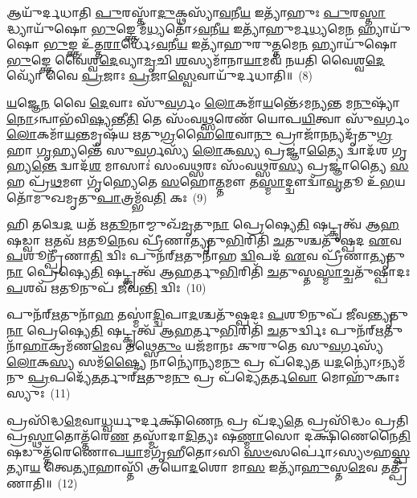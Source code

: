 𑌆𑌯𑍁᳴𑌰𑍍𑌦𑌧𑌾𑌤𑌿 \ul{𑌪𑍁}\-𑌰𑌸𑍍𑌤𑌾᳴\-\ul{𑌦𑍁}\-𑌕𑍍𑌥𑌸𑍍𑌯𑌾᳴\-\ul{𑌵}\-𑌨𑍀\-\ul{𑌯} 𑌇𑌤𑍍𑌯𑌾᳴𑌹𑍁𑌃 \ul{𑌪𑍁}\-𑌰\-\ul{𑌸𑍍𑌤𑌾}\-𑌦𑍍𑌧𑍍𑌯𑌾𑌯𑍁᳴𑌷𑍋 \ul{𑌭𑍁}\-𑌙𑍍𑌕𑍍𑌤𑍇 𑌮᳴\-\ul{𑌧𑍍𑌯}\-𑌤𑍋᳴\-𑌽\-\ul{𑌵}\-𑌨𑍀\-\ul{𑌯} 𑌇𑌤𑍍𑌯𑌾᳴𑌹𑍁𑌰𑍍𑌮\-\ul{𑌧𑍍𑌯}\-𑌮𑍇\-\ul{𑌨} 𑌹𑍍𑌯𑌾𑌯𑍁᳴𑌷𑍋 \ul{𑌭𑍁}\-𑌙𑍍𑌕𑍍𑌤 𑌉᳴𑌤𑍍𑌤\-\ul{𑌰𑌾}\-𑌰𑍍𑌧𑍇᳴\-𑌽\-\ul{𑌵}\-𑌨𑍀\-\ul{𑌯} 𑌇𑌤𑍍𑌯𑌾᳴𑌹𑍁𑌰𑍁\-\ul{𑌤𑍍𑌤}\-𑌮𑍇\-\ul{𑌨} 𑌹𑍍𑌯𑌾𑌯𑍁᳴𑌷𑍋 \ul{𑌭𑍁}\-𑌙𑍍𑌕𑍍𑌤𑍇 𑌵𑍈॑𑌶𑍍𑌵\-\ul{𑌦𑍇}\-𑌵𑍍𑌯𑌾\-\ul{𑌮𑍃}\-𑌚𑌿 \ul{𑌶}\-𑌸𑍍𑌯𑌮𑌾᳴𑌨𑌾\-\ul{𑌯𑌾}\-𑌮𑌵᳴ 𑌨𑌯𑌤𑌿 𑌵𑍈𑌶𑍍𑌵\-\ul{𑌦𑍇}\-𑌵𑍍𑌯𑍋᳴ 𑌵𑍈 \ul{𑌪𑍍𑌰}\-𑌜𑌾𑌃 \ul{𑌪𑍍𑌰}\-𑌜𑌾\-\ul{𑌸𑍍𑌵𑍇}\-𑌵𑌾𑌯𑍁᳴𑌰𑍍𑌦𑌧𑌾𑌤𑌿॥~(8)

{\anuvakamend[{\-\ul{𑌧𑍍𑌰𑍁}\-𑌵𑌸𑍍𑌤𑌸𑍍𑌮𑌾᳴\-\ul{𑌦𑍇}\-𑌵 \ul{𑌯}\-𑌜𑍍𑌞𑌸𑍍𑌯𑍈\-\ul{𑌕𑌾}\-𑌨𑍍𑌨𑌚᳴𑌤𑍍𑌵𑌾\-\ul{𑌰𑌿}\-\-\ul{𑍞}\-𑌶𑌚𑍍𑌚᳴}]}%

\-\ul{𑌯}\-𑌜𑍍𑌞𑍇\-\ul{𑌨} 𑌵𑍈 \ul{𑌦𑍇}\-𑌵𑌾𑌃 𑌸𑍁᳴\-\ul{𑌵}\-𑌰𑍍𑌗𑌂 \ul{𑌲𑍋}\-𑌕𑌮𑌾᳴\-\ul{𑌯}\-𑌨𑍍𑌤𑍇᳴\-𑌽𑌮𑌨𑍍𑌯𑌨𑍍𑌤 𑌮\-\ul{𑌨𑍁}\-𑌷𑍍𑌯𑌾᳴ \ul{𑌨𑍋}\-\-𑌽𑌨𑍍𑌵𑌾𑌭᳴𑌵𑌿\-\ul{𑌷𑍍𑌯}\-𑌨𑍍𑌤𑍀\-\ul{𑌤𑌿} 𑌤𑍇 𑌸𑌂᳴𑌵\-\ul{𑌥𑍍𑌸}\-𑌰𑍇𑌣᳴ 𑌯𑍋𑌪\-\ul{𑌯𑌿}\-𑌤𑍍𑌵𑌾 𑌸𑍁᳴\-\ul{𑌵}\-𑌰𑍍𑌗𑌂 \ul{𑌲𑍋}\-𑌕𑌮𑌾᳴\-\ul{𑌯}\-𑌨𑍍𑌤𑌮𑍃𑌷᳴𑌯 𑌋𑌤𑍁\-\ul{𑌗𑍍𑌰}\-𑌹𑍈\-\ul{𑌰𑍇}\-𑌵𑌾\-\ul{𑌨𑍁} 𑌪𑍍𑌰𑌾𑌜𑌾᳴\-\ul{𑌨}\-\-\ul{𑌨𑍍}\-𑌯𑌦𑍃᳴𑌤𑍁\-\ul{𑌗𑍍𑌰}\-𑌹𑌾 \ul{𑌗𑍃}\-𑌹𑍍𑌯𑌨𑍍𑌤𑍇᳴ 𑌸𑍁\-\ul{𑌵}\-𑌰𑍍𑌗𑌸𑍍𑌯᳴ \ul{𑌲𑍋}\-𑌕\-\ul{𑌸𑍍𑌯} 𑌪𑍍𑌰𑌜𑍍𑌞𑌾॑\-\ul{𑌤𑍍𑌯𑍈} 𑌦𑍍𑌵𑌾𑌦᳴𑌶 𑌗𑍃𑌹𑍍𑌯\-\ul{𑌨𑍍𑌤𑍇} 𑌦𑍍𑌵𑌾𑌦᳴\-\ul{𑌶} 𑌮𑌾𑌸𑌾𑌃॑ 𑌸𑌂𑌵\-\ul{𑌥𑍍𑌸}\-𑌰𑌃 𑌸𑌂᳴𑌵\-\ul{𑌥𑍍𑌸}\-𑌰\-\ul{𑌸𑍍𑌯} 𑌪𑍍𑌰𑌜𑍍𑌞𑌾॑𑌤𑍍𑌯𑍈 \ul{𑌸}\-𑌹 𑌪𑍍𑌰᳴\-\ul{𑌥}\-𑌮𑍗 𑌗𑍃᳴𑌹𑍍𑌯𑍇𑌤𑍇 \ul{𑌸}\-𑌹𑍋\-\ul{𑌤𑍍𑌤}\-𑌮𑍗 𑌤\-\ul{𑌸𑍍𑌮𑌾}\-𑌦𑍍𑌦𑍍𑌵𑍗𑌦𑍍𑌵𑌾᳴\-\ul{𑌵𑍃}\-𑌤𑍂 𑌉᳴\-\ul{𑌭}\-𑌯𑌤𑍋᳴𑌮𑍁𑌖𑌮𑍃𑌤𑍁\-\ul{𑌪𑌾}\-𑌤𑍍𑌰𑌮𑍍𑌭᳴𑌵\-\ul{𑌤𑌿} 𑌕𑌃~(9)

𑌹𑌿 𑌤𑌦𑍍𑌵𑍇\-\ul{𑌦} 𑌯𑌤᳴ 𑌋\-\ul{𑌤𑍂}\-𑌨𑌾𑌮𑍍𑌮𑍁𑌖᳴\-\ul{𑌮𑍃}\-𑌤𑍁\-\ul{𑌨𑌾} 𑌪𑍍𑌰𑍇𑌷𑍍𑌯𑍇\-\ul{𑌤𑌿} 𑌷𑌟𑍍𑌕𑍃𑌤𑍍𑌵᳴ 𑌆\-\ul{𑌹} 𑌷𑌡𑍍𑌵𑌾 \ul{𑌋}\-𑌤𑌵᳴ \ul{𑌋}\-𑌤𑍂\-\ul{𑌨𑍇}\-𑌵 𑌪𑍍𑌰𑍀᳴𑌣𑌾\-\ul{𑌤𑍍𑌯𑍃}\-𑌤𑍁\-\ul{𑌭𑌿}\-𑌰𑌿𑌤𑌿᳴ \ul{𑌚}\-𑌤𑍁𑌶𑍍𑌚𑌤𑍁᳴𑌷𑍍𑌪𑌦 \ul{𑌏}\-𑌵 \ul{𑌪}\-𑌶𑍂𑌨𑍍𑌪𑍍𑌰𑍀᳴𑌣𑌾\-\ul{𑌤𑌿} 𑌦𑍍𑌵𑌿𑌃 𑌪𑍁𑌨᳴𑌰𑍍\mbox{}\-\ul{𑌋}\-𑌤𑍁𑌨𑌾᳴𑌹 \ul{𑌦𑍍𑌵𑌿}\-𑌪𑌦᳴ \ul{𑌏}\-𑌵 𑌪𑍍𑌰𑍀᳴𑌣𑌾\-\ul{𑌤𑍍𑌯𑍃}\-𑌤𑍁\-\ul{𑌨𑌾} 𑌪𑍍𑌰𑍇𑌷𑍍𑌯𑍇\-\ul{𑌤𑌿} 𑌷𑌟𑍍𑌕𑍃𑌤𑍍𑌵᳴ 𑌆\-\ul{𑌹}\-𑌰𑍍𑌤𑍁\-\ul{𑌭𑌿}\-𑌰𑌿𑌤𑌿᳴ \ul{𑌚}\-𑌤𑍁𑌸𑍍𑌤\-\ul{𑌸𑍍𑌮𑌾}\-𑌚𑍍𑌚𑌤𑍁᳴𑌷𑍍𑌪𑌾𑌦𑌃 \ul{𑌪}\-𑌶𑌵᳴ \ul{𑌋}\-𑌤𑍂𑌨𑍁𑌪᳴ 𑌜𑍀𑌵\-\ul{𑌨𑍍𑌤𑌿} 𑌦𑍍𑌵𑌿𑌃~(10)

𑌪𑍁𑌨᳴𑌰𑍍\mbox{}\-\ul{𑌋}\-𑌤𑍁𑌨𑌾᳴\-\ul{𑌹} 𑌤𑌸𑍍𑌮𑌾॑\-\ul{𑌦𑍍𑌦𑍍𑌵𑌿}\-𑌪𑌾\-\ul{𑌦}\-𑌶𑍍𑌚𑌤𑍁᳴𑌷𑍍𑌪𑌦𑌃 \ul{𑌪}\-𑌶𑍂𑌨𑍁𑌪᳴ 𑌜𑍀𑌵\-\ul{𑌨𑍍𑌤𑍍𑌯𑍃}\-𑌤𑍁\-\ul{𑌨𑌾} 𑌪𑍍𑌰𑍇𑌷𑍍𑌯𑍇\-\ul{𑌤𑌿} 𑌷𑌟𑍍𑌕𑍃𑌤𑍍𑌵᳴ 𑌆\-\ul{𑌹}\-𑌰𑍍𑌤𑍁\-\ul{𑌭𑌿}\-𑌰𑌿𑌤𑌿᳴ \ul{𑌚}\-𑌤𑍁𑌰𑍍𑌦𑍍𑌵𑌿𑌃 𑌪𑍁𑌨᳴𑌰𑍍\mbox{}\-\ul{𑌋}\-𑌤𑍁𑌨𑌾᳴\-\ul{𑌹𑌾}\-𑌕𑍍𑌰𑌮᳴𑌣\-\ul{𑌮𑍇}\-𑌵 𑌤𑌥𑍍𑌸𑍇\-\ul{𑌤𑍁𑌂} 𑌯𑌜᳴𑌮𑌾𑌨𑌃 𑌕𑍁𑌰𑍁𑌤𑍇 𑌸𑍁\-\ul{𑌵}\-𑌰𑍍𑌗𑌸𑍍𑌯᳴ \ul{𑌲𑍋}\-𑌕\-\ul{𑌸𑍍𑌯} 𑌸𑌮᳴\-\ul{𑌷𑍍𑌟𑍍𑌯𑍈} 𑌨𑌾𑌨𑍍𑌯𑍋॑𑌨𑍍𑌯𑌮\-\ul{𑌨𑍁} 𑌪𑍍𑌰 𑌪᳴𑌦𑍍𑌯𑍇\-\ul{𑌤} 𑌯\-\ul{𑌦}\-𑌨𑍍𑌯𑍋॑\-𑌽𑌨𑍍𑌯𑌮᳴𑌨𑍁 \ul{𑌪𑍍𑌰}\-𑌪𑌦𑍍𑌯𑍇᳴\-\ul{𑌤}\-𑌰𑍍𑌤𑍁𑌰𑍍\mbox{}\-\ul{𑌋}\-𑌤𑍁𑌮\-\ul{𑌨𑍁} 𑌪𑍍𑌰 𑌪᳴𑌦𑍍𑌯𑍇\-\ul{𑌤}\-𑌰𑍍𑌤\-\ul{𑌵𑍋} 𑌮𑍋𑌹𑍁᳴𑌕𑌾𑌃 𑌸𑍍𑌯𑍁𑌃~(11)

𑌪𑍍𑌰𑌸𑌿᳴𑌦𑍍𑌧\-\ul{𑌮𑍇}\-𑌵𑌾\-\ul{𑌧𑍍𑌵}\-𑌰𑍍𑌯𑍁𑌰𑍍𑌦𑌕𑍍𑌷𑌿᳴𑌣𑍇\-\ul{𑌨} 𑌪𑍍𑌰 𑌪᳴𑌦𑍍𑌯\-\ul{𑌤𑍇} 𑌪𑍍𑌰𑌸𑌿᳴𑌦𑍍𑌧𑌂 𑌪𑍍𑌰𑌤𑌿𑌪𑍍𑌰\-\ul{𑌸𑍍𑌥𑌾}\-𑌤𑍋𑌤𑍍𑌤᳴𑌰𑍇\-\ul{𑌣} 𑌤𑌸𑍍𑌮𑌾᳴𑌦𑌾\-\ul{𑌦𑌿}\-𑌤𑍍𑌯𑌃 𑌷\-\ul{𑌣𑍍𑌮𑌾}\-𑌸𑍋 𑌦𑌕𑍍𑌷𑌿᳴𑌣𑍇𑌨𑍈\-\ul{𑌤𑌿} 𑌷𑌡𑍁𑌤𑍍𑌤᳴𑌰𑍇𑌣𑍋𑌪\-\ul{𑌯𑌾}\-𑌮𑌗𑍃᳴𑌹𑍀𑌤𑍋\-𑌽𑌸𑌿 \ul{𑌸}\-\-\ul{𑍞}\-𑌸𑌰𑍍𑌪𑍋॑\-𑌽𑌸𑍍𑌯𑍞𑌹\-\ul{𑌸𑍍𑌪}\-𑌤𑍍𑌯𑌾\-\ul{𑌯} 𑌤𑍍𑌵𑍇\-\ul{𑌤𑍍𑌯𑌾}\-𑌹𑌾𑌸𑍍𑌤𑌿᳴ 𑌤𑍍𑌰𑌯𑍋\-\ul{𑌦}\-𑌶𑍋 𑌮𑌾\-\ul{𑌸} 𑌇𑌤𑍍𑌯𑌾᳴\-\ul{𑌹𑍁}\-𑌸𑍍𑌤\-\ul{𑌮𑍇}\-𑌵 𑌤𑌤𑍍𑌪𑍍𑌰𑍀᳴𑌣𑌾𑌤𑌿॥~(12)

